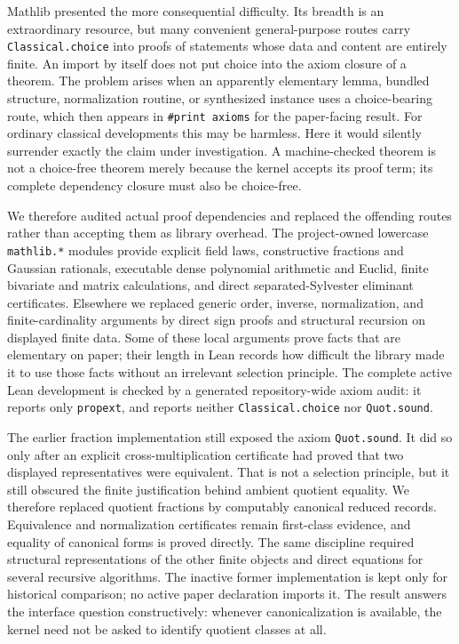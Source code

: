\documentclass[11pt]{article}
\begin{document}
Mathlib presented the more consequential difficulty.  Its breadth is an
extraordinary resource, but many convenient general-purpose routes carry
\texttt{Classical.choice} into proofs of statements whose data and content
are entirely finite.  An import by itself does not put choice into the axiom
closure of a theorem.  The problem arises when an apparently elementary
lemma, bundled structure, normalization routine, or synthesized instance
uses a choice-bearing route, which then appears in \texttt{\#print axioms}
for the paper-facing result.  For ordinary classical developments this may
be harmless.  Here it would silently surrender exactly the claim under
investigation.  A machine-checked theorem is not a choice-free theorem merely
because the kernel accepts its proof term; its complete dependency closure
must also be choice-free.

We therefore audited actual proof dependencies and replaced the offending
routes rather than accepting them as library overhead.  The project-owned
lowercase \texttt{mathlib.*} modules provide explicit field laws,
constructive fractions and Gaussian rationals, executable dense polynomial
arithmetic and Euclid, finite bivariate and matrix calculations, and direct
separated-Sylvester eliminant certificates.  Elsewhere we replaced generic order,
inverse, normalization, and finite-cardinality arguments by direct sign
proofs and structural recursion on displayed finite data.  Some of these
local arguments prove facts that are elementary on paper; their length in
Lean records how difficult the library made it to use those facts without an
irrelevant selection principle.  The complete active Lean development is
checked by a generated repository-wide axiom audit: it reports only
\texttt{propext}, and reports neither \texttt{Classical.choice} nor
\texttt{Quot.sound}.

The earlier fraction implementation still exposed the axiom
\texttt{Quot.sound}.  It did so only after an explicit cross-multiplication
certificate had proved that two displayed representatives were equivalent.
That is not a selection principle, but it still obscured the finite
justification behind ambient quotient equality.  We therefore replaced
quotient fractions by computably canonical reduced records.  Equivalence and
normalization certificates remain first-class evidence, and equality of
canonical forms is proved directly.  The same discipline required structural
representations of the other finite objects and direct equations for several
recursive algorithms.
The inactive former implementation is kept only for historical comparison;
no active paper declaration imports it.  The result answers the interface
question constructively: whenever canonicalization is available, the kernel
need not be asked to identify quotient classes at all.
\end{document}
